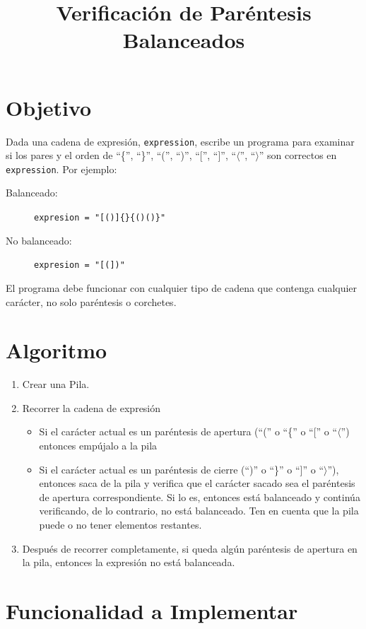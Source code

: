 \documentclass[10pt,a4paper]{article}
\title{{\huge Verificación de Paréntesis Balanceados}}
\date{}
\begin{document}
\maketitle


\section{Objetivo}
Dada una cadena de expresión, \lstinline|expression|, escribe un programa para examinar si los pares y el orden de ``\{'', ``\}'', ``('', ``)'', ``['', ``]'', ``$\langle$'', ``$\rangle$'' son correctos en \lstinline|expression|. Por ejemplo:
\begin{description}
\item[Balanceado:] \lstinline|expresion = "[()]{}{()()}"|
\item[No balanceado:] \lstinline|expresion = "[(])"|
\end{description}

El programa debe funcionar con cualquier tipo de cadena que contenga cualquier carácter, no solo paréntesis o corchetes.

\section{Algoritmo}
\begin{enumerate}
\item Crear una Pila.
\item Recorrer la cadena de expresión
    \begin{itemize}
    \item Si el carácter actual es un paréntesis de apertura (``('' o ``\{'' o ``['' o ``$\langle$'') entonces empújalo a la pila
    \item Si el carácter actual es un paréntesis de cierre (``)'' o ``\}'' o ``]'' o ``$\rangle$''), entonces saca de la pila y verifica que el carácter sacado sea el paréntesis de apertura correspondiente. Si lo es, entonces está balanceado y continúa verificando, de lo contrario, no está balanceado. Ten en cuenta que la pila puede o no tener elementos restantes.
    \end{itemize}
\item Después de recorrer completamente, si queda algún paréntesis de apertura en la pila, entonces la expresión no está balanceada.
\end{enumerate}

\section{Funcionalidad a Implementar}
\end{document}
